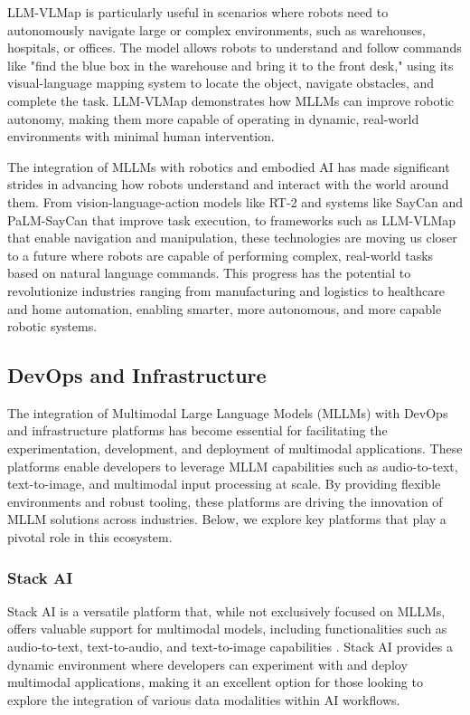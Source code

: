 LLM-VLMap is particularly useful in scenarios where robots need to autonomously navigate large or complex environments, such as warehouses, hospitals, or offices. 
The model allows robots to understand and follow commands like "find the blue box in the warehouse and bring it to the front desk," using its visual-language mapping system to locate the object, navigate obstacles, and complete the task. 
LLM-VLMap demonstrates how MLLMs can improve robotic autonomy, making them more capable of operating in dynamic, real-world environments with minimal human intervention.

The integration of MLLMs with robotics and embodied AI has made significant strides in advancing how robots understand and interact with the world around them. 
From vision-language-action models like RT-2 and systems like SayCan and PaLM-SayCan that improve task execution, to frameworks such as LLM-VLMap that enable navigation and manipulation, these technologies are moving us closer to a future where robots are capable of performing complex, real-world tasks based on natural language commands. 
This progress has the potential to revolutionize industries ranging from manufacturing and logistics to healthcare and home automation, enabling smarter, more autonomous, and more capable robotic systems.

\subsection{DevOps and Infrastructure}

The integration of Multimodal Large Language Models (MLLMs) with DevOps \cite{ebert2016devops} and infrastructure platforms has become essential for facilitating the experimentation, development, and deployment of multimodal applications. 
These platforms enable developers to leverage MLLM capabilities such as audio-to-text, text-to-image, and multimodal input processing at scale. 
By providing flexible environments and robust tooling, these platforms are driving the innovation of MLLM solutions across industries. 
Below, we explore key platforms that play a pivotal role in this ecosystem.

\subsubsection{Stack AI}

Stack AI is a versatile platform that, while not exclusively focused on MLLMs, offers valuable support for multimodal models, including functionalities such as audio-to-text, text-to-audio, and text-to-image capabilities \cite{waleed2024efficient}. 
Stack AI provides a dynamic environment where developers can experiment with and deploy multimodal applications, making it an excellent option for those looking to explore the integration of various data modalities within AI workflows.


